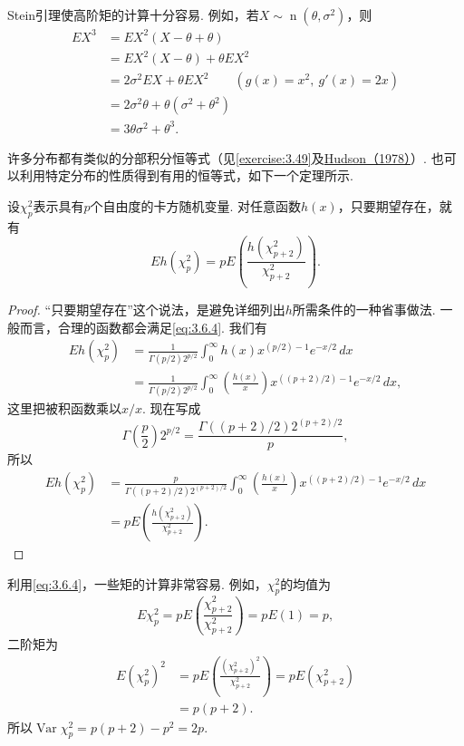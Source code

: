 \begin{example}[高阶正态矩]\label{ex:3.6.6}
Stein引理使高阶矩的计算十分容易. 例如，若$X\sim\operatorname n(\theta,\sigma^2)$，则
\begin{align*}
EX^3&=EX^2(X-\theta+\theta)\\
&=EX^2(X-\theta)+\theta EX^2\\
&=2\sigma^2EX+\theta EX^2\qquad(g(x)=x^2,\ g'(x)=2x)\\
&=2\sigma^2\theta+\theta(\sigma^2+\theta^2)\\
&=3\theta\sigma^2+\theta^3.
\end{align*}
\end{example}
许多分布都有类似的分部积分恒等式（见\autoref{exercise:3.49}及\hyperref[bib:source172]{Hudson（1978）}）. 也可以利用特定分布的性质得到有用的恒等式，如下一个定理所示.

\begin{theorem}\label{thm:3.6.7}
设$\chi_p^2$表示具有$p$个自由度的卡方随机变量. 对任意函数$h(x)$，只要期望存在，就有
\begin{equation}\label{eq:3.6.4}
Eh(\chi_p^2)=pE\left(\frac{h(\chi_{p+2}^2)}{\chi_{p+2}^2}\right).
\end{equation}
\end{theorem}
\begin{proof}
“只要期望存在”这个说法，是避免详细列出$h$所需条件的一种省事做法. 一般而言，合理的函数都会满足\eqref{eq:3.6.4}. 我们有
\begin{align*}
Eh(\chi_p^2)&=\frac1{\Gamma(p/2)2^{p/2}}\int_0^\infty h(x)x^{(p/2)-1}e^{-x/2}\,dx\\
&=\frac1{\Gamma(p/2)2^{p/2}}\int_0^\infty\left(\frac{h(x)}x\right)x^{((p+2)/2)-1}e^{-x/2}\,dx,
\end{align*}
这里把被积函数乘以$x/x$. 现在写成
$$\Gamma\left(\frac p2\right)2^{p/2}=\frac{\Gamma((p+2)/2)2^{(p+2)/2}}p,$$
所以
\begin{align*}
Eh(\chi_p^2)&=\frac p{\Gamma((p+2)/2)2^{(p+2)/2}}\int_0^\infty\left(\frac{h(x)}x\right)x^{((p+2)/2)-1}e^{-x/2}\,dx\\
&=pE\left(\frac{h(\chi_{p+2}^2)}{\chi_{p+2}^2}\right).
\end{align*}
\end{proof}
利用\eqref{eq:3.6.4}，一些矩的计算非常容易. 例如，$\chi_p^2$的均值为
$$E\chi_p^2=pE\left(\frac{\chi_{p+2}^2}{\chi_{p+2}^2}\right)=pE(1)=p,$$
二阶矩为
\begin{align*}
E(\chi_p^2)^2&=pE\left(\frac{(\chi_{p+2}^2)^2}{\chi_{p+2}^2}\right)=pE(\chi_{p+2}^2)\\
&=p(p+2).
\end{align*}
所以$\operatorname{Var}\chi_p^2=p(p+2)-p^2=2p$.

